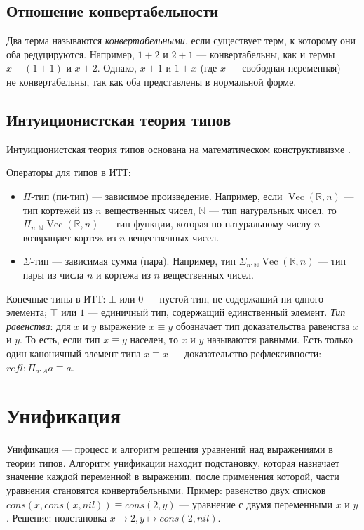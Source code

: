\subsection{Отношение конвертабельности}
Два терма называются \emph{конвертабельными}, если существует терм, к которому
они оба редуцируются. Например, $1+2$ и $2+1$ — конвертабельны, как и термы
$x + (1 + 1)$ и $x + 2$. Однако, $x+1$ и $1+x$ (где $x$ — свободная переменная)
— не конвертабельны, так как оба представлены в нормальной форме.
\subsection{Интуиционистская теория типов}
Интуиционистская теория типов основана на математическом конструктивизме \cite{MLTT}.

Операторы для типов в ИТТ:
\begin{itemize}
    \item $\Pi$-тип (пи-тип) — зависимое произведение.
        Например, если $\operatorname{Vec}({\mathbb R}, n)$ — тип кортежей из $n$ вещественных чисел,
        $\mathbb N$ — тип натуральных чисел, то
        $\Pi_{n \mathbin{:} {\mathbb N}} \operatorname{Vec}({\mathbb R}, n)$ 
        — тип функции, которая по натуральному числу $n$ возвращает кортеж из
        $n$ вещественных чисел.
    \item $\Sigma$-тип — зависимая сумма (пара).
        Например, тип $\Sigma_{n \mathbin{:} {\mathbb N}} \operatorname{Vec}({\mathbb R}, n)$ — тип 
        пары из числа $n$ и кортежа из $n$ вещественных чисел.
\end{itemize}
Конечные типы в ИТТ:
$\bot$ или $0$ — пустой тип, не содержащий ни одного элемента;
$\top$ или $1$ — единичный тип, содержащий единственный элемент.
\emph{Тип равенства}: для $x$ и $y$ выражение
$x \equiv y$ обозначает тип доказательства равенства $x$ и $y$.
То есть, если тип $x \equiv y$ населен, то $x$ и $y$ называются равными.
Есть только один каноничный элемент типа $x \equiv x$ — доказательство
рефлексивности: $refl : \Pi_{a : A} a \equiv a $.
\section{Унификация}

Унификация — процесс и алгоритм решения уравнений над выражениями в теории типов.
Алгоритм унификации находит подстановку, которая назначает значение
каждой переменной в выражении, после применения которой,
части уравнения становятся конвертабельными.
Пример: равенство двух списков $cons(x,cons(x,nil)) \equiv cons(2,y) $
— уравнение с двумя переменными $x$ и $y$.
Решение: подстановка $ x \mapsto 2, y \mapsto cons(2,nil) $.

